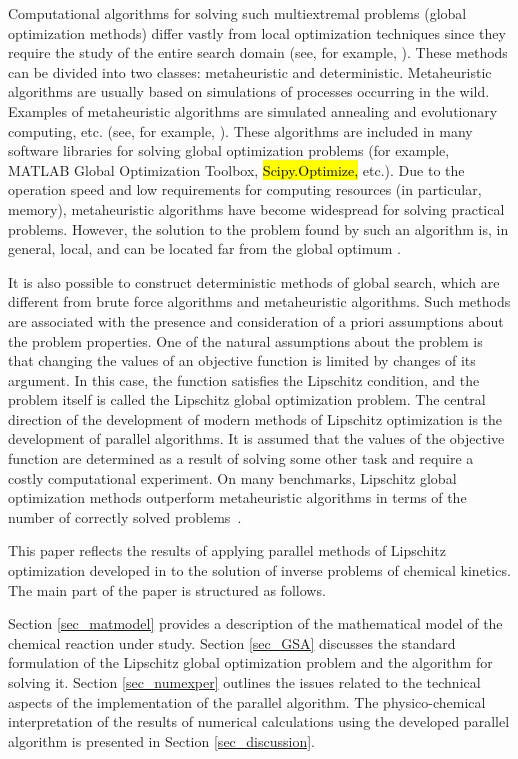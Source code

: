 \documentclass[mathematics,article,accept,pdftex,moreauthors]{Definitions/mdpi}
\begin{document}
	Computational algorithms for solving such multiextremal problems (global optimization methods) differ vastly from local optimization techniques since they require the study of the entire search domain (see, for example, \cite{PaulaviciusZilinskas2014,Sergeyev2017}). These methods can be divided into two classes: metaheuristic and deterministic. Metaheuristic algorithms are usually based on simulations of processes occurring in the wild.
	Examples of metaheuristic algorithms are simulated annealing and evolutionary computing, etc. (see, for example, \cite{Battiti2009,Eiben2015}).
	These algorithms are included in many software libraries for solving global optimization problems (for example, MATLAB Global Optimization Toolbox, \hl{Scipy.Optimize,} %
 etc.).
	Due to the operation speed and low requirements for computing resources (in particular, memory), metaheuristic algorithms have become widespread for solving practical problems. However, the solution to the problem found by such an algorithm is, in general, local, and can be located far from the global optimum \cite{Kvasov2018}. 
	
	It is also possible to construct deterministic methods of global search, which are different from brute force algorithms and metaheuristic algorithms. Such methods are associated with the presence and consideration of a priori assumptions about the problem properties. 
	One of the natural assumptions about the problem is that changing the values of an objective function is limited by changes of its argument. In this case, the function satisfies the Lipschitz condition, and the problem itself is called the Lipschitz global optimization problem. The central direction of the development of modern methods of Lipschitz optimization is the development of parallel algorithms. It is assumed that the values of the objective function are determined as a result of solving some other task and require a costly computational experiment.
	{On many benchmarks, Lipschitz global optimization methods outperform metaheuristic algorithms in terms of the number of correctly solved problems~\cite{Sergeyev2018,Sovrasov2019}.}
	
	
	This paper reflects the results of applying parallel methods of Lipschitz optimization developed in \cite{Barkalov2016,Strongin2018,Sysoyev2017} to the solution of inverse problems of chemical kinetics.  
	The main part of the paper is structured as follows. 
	
	Section \ref{sec_matmodel} provides a description of the mathematical model of the chemical reaction under study. Section \ref{sec_GSA} discusses the standard formulation of the Lipschitz global optimization problem and the algorithm for solving it. Section \ref{sec_numexper} outlines the issues related to the technical aspects of the implementation of the parallel algorithm. The physico-chemical interpretation of the results of numerical calculations using the developed parallel algorithm is presented in Section \ref{sec_discussion}. 
	
\end{document}
